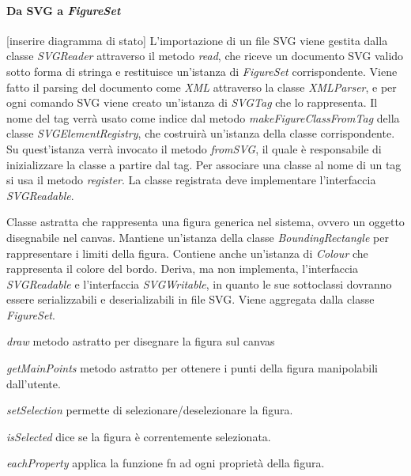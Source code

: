 \paragraph{Da SVG a \textit{FigureSet}}
[inserire diagramma di stato]
L'importazione di un file SVG viene gestita dalla classe \textit{SVGReader} attraverso il metodo \textit{read}, che riceve un documento SVG valido sotto forma di stringa e restituisce un'istanza di \textit{FigureSet} corrispondente. Viene fatto il parsing del documento come \textit{XML} attraverso la classe \textit{XMLParser}, e per ogni comando SVG viene creato un'istanza di \textit{SVGTag} che lo rappresenta. Il nome del tag verr\`a usato come indice dal metodo \textit{makeFigureClassFromTag} della classe \textit{SVGElementRegistry}, che costruir\`a un'istanza della classe corrispondente. Su quest'istanza verr\`a invocato il metodo \textit{fromSVG}, il quale \`e responsabile di inizializzare la classe a partire dal tag. Per associare una classe al nome di un tag si usa il metodo \textit{register}. La classe registrata deve implementare l'interfaccia \textit{SVGReadable}. 


Classe astratta che rappresenta una figura generica nel sistema, ovvero un oggetto disegnabile nel canvas.
Mantiene un'istanza della classe \textit{BoundingRectangle} per rappresentare i limiti della figura. Contiene anche un'istanza di \textit{Colour} che rappresenta il colore del bordo. Deriva, ma non implementa, l'interfaccia \textit{SVGReadable} e l'interfaccia \textit{SVGWritable}, in quanto le sue sottoclassi dovranno essere serializzabili e deserializabili in file SVG.
Viene aggregata dalla classe \textit{FigureSet}.
\begin{elencopuntato}[\textbf{}]{\subsubsecindent}
\item \textit{draw} metodo astratto per disegnare la figura sul canvas
\item \textit{getMainPoints} metodo astratto per ottenere i punti della figura manipolabili dall'utente.
\item \textit{setSelection} permette di selezionare/deselezionare la figura.
\item \textit{isSelected} dice se la figura \`e correntemente selezionata.
\item \textit{eachProperty} applica la funzione fn ad ogni propriet\`a della figura.
\end{elencopuntato}

